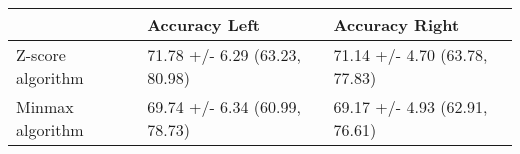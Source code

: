 \begin{tabular}{lll}
\toprule
{} &                  Accuracy Left &                 Accuracy Right \\
\midrule
Z-score algorithm &  71.78 +/- 6.29 (63.23, 80.98) &  71.14 +/- 4.70 (63.78, 77.83) \\
Minmax algorithm  &  69.74 +/- 6.34 (60.99, 78.73) &  69.17 +/- 4.93 (62.91, 76.61) \\
\bottomrule
\end{tabular}

